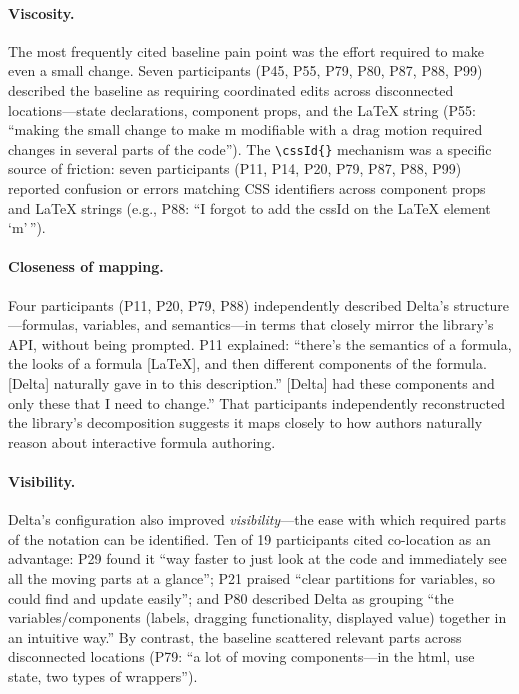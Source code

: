\paragraph{Viscosity.} 
The most frequently cited baseline pain point was the effort required to make even a small change. Seven participants (P45, P55, P79, P80, P87, P88, P99) described the baseline as requiring coordinated edits across disconnected locations---state declarations, component props, and the LaTeX string (P55: ``making the small change to make m modifiable with a drag motion required changes in several parts of the code''). The \texttt{\textbackslash cssId\{\}} mechanism was a specific source of friction: seven participants (P11, P14, P20, P79, P87, P88, P99) reported confusion or errors matching CSS identifiers across component props and LaTeX strings (e.g., P88: ``I forgot to add the cssId on the LaTeX element `m'\,'').

\paragraph{Closeness of mapping.}
Four participants (P11, P20, P79, P88) independently described Delta's structure---formulas, variables, and semantics---in terms that closely mirror the library's API, without being prompted. P11 explained: ``there's the semantics of a formula, the looks of a formula [LaTeX], and then different components of the formula. [Delta] naturally gave in to this description.'' [Delta] had these components and only these that I need to change.'' That participants independently reconstructed the library's decomposition suggests it maps closely to how authors naturally reason about interactive formula authoring.

\paragraph{Visibility.}
Delta's configuration also improved \emph{visibility}---the ease with which required parts of the notation can be identified. Ten of 19 participants cited co-location as an advantage: P29 found it ``way faster to just look at the code and immediately see all the moving parts at a glance''; P21 praised ``clear partitions for variables, so could find and update easily''; and P80 described Delta as grouping ``the variables/components (labels, dragging functionality, displayed value) together in an intuitive way.'' By contrast, the baseline scattered relevant parts across disconnected locations (P79: ``a lot of moving components---in the html, use state, two types of wrappers'').

